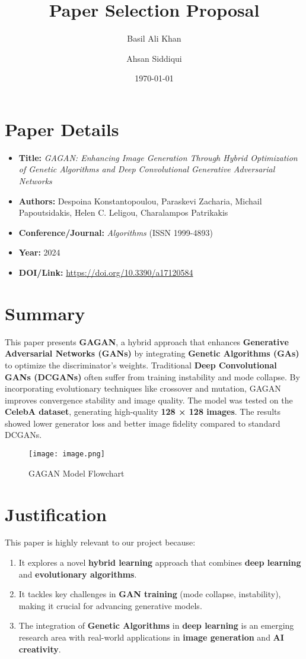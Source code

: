 \documentclass[a4paper,12pt]{article}
\title{Paper Selection Proposal}
\author{Basil Ali Khan \and Ahsan Siddiqui}
\date{\today}
\begin{document}
\maketitle

\section*{Paper Details}
\begin{itemize}
    \item \textbf{Title:} \textit{GAGAN: Enhancing Image Generation Through Hybrid Optimization of Genetic Algorithms and Deep Convolutional Generative Adversarial Networks}
    \item \textbf{Authors:} Despoina Konstantopoulou, Paraskevi Zacharia, Michail Papoutsidakis, Helen C. Leligou, Charalampos Patrikakis
    \item \textbf{Conference/Journal:} \textit{Algorithms} (ISSN 1999-4893)
    \item \textbf{Year:} 2024
    \item \textbf{DOI/Link:} \href{https://doi.org/10.3390/a17120584}{https://doi.org/10.3390/a17120584}
\end{itemize}

\section*{Summary}
This paper presents \textbf{GAGAN}, a hybrid approach that enhances \textbf{Generative Adversarial Networks (GANs)} by integrating \textbf{Genetic Algorithms (GAs)} to optimize the discriminator's weights. Traditional \textbf{Deep Convolutional GANs (DCGANs)} often suffer from training instability and mode collapse. By incorporating evolutionary techniques like crossover and mutation, GAGAN improves convergence stability and image quality. The model was tested on the \textbf{CelebA dataset}, generating high-quality \textbf{128 × 128 images}. The results showed lower generator loss and better image fidelity compared to standard DCGANs.
\begin{figure}
    \centering
    \texttt{[image: image.png]}
    \caption{GAGAN Model Flowchart}
    \label{fig:enter-label}
\end{figure}

\section*{Justification}
This paper is highly relevant to our project because:
\begin{enumerate}
    \item It explores a novel \textbf{hybrid learning} approach that combines \textbf{deep learning} and \textbf{evolutionary algorithms}.
    \item It tackles key challenges in \textbf{GAN training} (mode collapse, instability), making it crucial for advancing generative models.
    \item The integration of \textbf{Genetic Algorithms} in \textbf{deep learning} is an emerging research area with real-world applications in \textbf{image generation} and \textbf{AI creativity}.
\end{enumerate}
\end{document}
